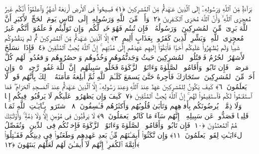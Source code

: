 
  
    
  
    
    

 بَرَآءَةٌۭ مِّنَ ٱللَّهِ وَرَسُولِهِۦٓ إِلَى ٱلَّذِينَ عَـٰهَدتُّم مِّنَ ٱلمُشرِكِينَ ﴿١﴾
 فَسِيحُوا۟ فِى ٱلأَرضِ أَربَعَةَ أَشهُرٍۢ وَٱعلَمُوٓا۟ أَنَّكُم غَيرُ مُعجِزِى ٱللَّهِ ۙ وَأَنَّ ٱللَّهَ مُخزِى ٱلكَـٰفِرِينَ ﴿٢﴾
 وَأَذَٟنٌۭ مِّنَ ٱللَّهِ وَرَسُولِهِۦٓ إِلَى ٱلنَّاسِ يَومَ ٱلحَجِّ ٱلأَكبَرِ أَنَّ ٱللَّهَ بَرِىٓءٌۭ مِّنَ ٱلمُشرِكِينَ ۙ وَرَسُولُهُۥ ۚ فَإِن تُبتُم فَهُوَ خَيرٌۭ لَّكُم ۖ وَإِن تَوَلَّيتُم فَٱعلَمُوٓا۟ أَنَّكُم غَيرُ مُعجِزِى ٱللَّهِ ۗ وَبَشِّرِ ٱلَّذِينَ كَفَرُوا۟ بِعَذَابٍ أَلِيمٍ ﴿٣﴾
 إِلَّا ٱلَّذِينَ عَـٰهَدتُّم مِّنَ ٱلمُشرِكِينَ ثُمَّ لَم يَنقُصُوكُم شَيـًۭٔا وَلَم يُظَـٰهِرُوا۟ عَلَيكُم أَحَدًۭا فَأَتِمُّوٓا۟ إِلَيهِم عَهدَهُم إِلَىٰ مُدَّتِهِم ۚ إِنَّ ٱللَّهَ يُحِبُّ ٱلمُتَّقِينَ ﴿٤﴾
 فَإِذَا ٱنسَلَخَ ٱلأَشهُرُ ٱلحُرُمُ فَٱقتُلُوا۟ ٱلمُشرِكِينَ حَيثُ وَجَدتُّمُوهُم وَخُذُوهُم وَٱحصُرُوهُم وَٱقعُدُوا۟ لَهُم كُلَّ مَرصَدٍۢ ۚ فَإِن تَابُوا۟ وَأَقَامُوا۟ ٱلصَّلَوٰةَ وَءَاتَوُا۟ ٱلزَّكَوٰةَ فَخَلُّوا۟ سَبِيلَهُم ۚ إِنَّ ٱللَّهَ غَفُورٌۭ رَّحِيمٌۭ ﴿٥﴾
 وَإِن أَحَدٌۭ مِّنَ ٱلمُشرِكِينَ ٱستَجَارَكَ فَأَجِرهُ حَتَّىٰ يَسمَعَ كَلَـٰمَ ٱللَّهِ ثُمَّ أَبلِغهُ مَأمَنَهُۥ ۚ ذَٟلِكَ بِأَنَّهُم قَومٌۭ لَّا يَعلَمُونَ ﴿٦﴾
 كَيفَ يَكُونُ لِلمُشرِكِينَ عَهدٌ عِندَ ٱللَّهِ وَعِندَ رَسُولِهِۦٓ إِلَّا ٱلَّذِينَ عَـٰهَدتُّم عِندَ ٱلمَسجِدِ ٱلحَرَامِ ۖ فَمَا ٱستَقَـٰمُوا۟ لَكُم فَٱستَقِيمُوا۟ لَهُم ۚ إِنَّ ٱللَّهَ يُحِبُّ ٱلمُتَّقِينَ ﴿٧﴾
 كَيفَ وَإِن يَظهَرُوا۟ عَلَيكُم لَا يَرقُبُوا۟ فِيكُم إِلًّۭا وَلَا ذِمَّةًۭ ۚ يُرضُونَكُم بِأَفوَٟهِهِم وَتَأبَىٰ قُلُوبُهُم وَأَكثَرُهُم فَـٰسِقُونَ ﴿٨﴾
 ٱشتَرَوا۟ بِـَٔايَـٰتِ ٱللَّهِ ثَمَنًۭا قَلِيلًۭا فَصَدُّوا۟ عَن سَبِيلِهِۦٓ ۚ إِنَّهُم سَآءَ مَا كَانُوا۟ يَعمَلُونَ ﴿٩﴾
 لَا يَرقُبُونَ فِى مُؤمِنٍ إِلًّۭا وَلَا ذِمَّةًۭ ۚ وَأُو۟لَـٰٓئِكَ هُمُ ٱلمُعتَدُونَ ﴿١٠﴾
 فَإِن تَابُوا۟ وَأَقَامُوا۟ ٱلصَّلَوٰةَ وَءَاتَوُا۟ ٱلزَّكَوٰةَ فَإِخوَٟنُكُم فِى ٱلدِّينِ ۗ وَنُفَصِّلُ ٱلءَايَـٰتِ لِقَومٍۢ يَعلَمُونَ ﴿١١﴾
 وَإِن نَّكَثُوٓا۟ أَيمَـٰنَهُم مِّنۢ بَعدِ عَهدِهِم وَطَعَنُوا۟ فِى دِينِكُم فَقَـٰتِلُوٓا۟ أَئِمَّةَ ٱلكُفرِ ۙ إِنَّهُم لَآ أَيمَـٰنَ لَهُم لَعَلَّهُم يَنتَهُونَ ﴿١٢﴾
